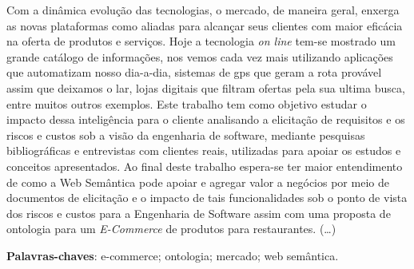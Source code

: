 \begin{resumo}

Com a dinâmica evolução das tecnologias, o mercado, de maneira geral,
 enxerga as novas plataformas como aliadas para alcançar seus clientes com maior
 eficácia na oferta de produtos e serviços. Hoje a tecnologia \textit{on line}
 tem-se mostrado um grande catálogo de informações, nos vemos cada vez
 mais utilizando aplicações que automatizam nosso dia-a-dia, sistemas de gps
 que geram a rota provável assim que deixamos o lar, lojas digitais que filtram
 ofertas pela sua ultima busca, entre muitos outros exemplos. Este trabalho tem
 como objetivo estudar o impacto dessa inteligência para o cliente
 analisando a elicitação de requisitos e os riscos e custos sob a visão da engenharia de 
 software, mediante pesquisas  bibliográficas e entrevistas com clientes  reais, utilizadas para apoiar
 os estudos e conceitos apresentados. Ao final deste trabalho espera-se ter maior
 entendimento de como a Web Semântica pode apoiar e agregar valor a negócios 
 por meio de documentos de elicitação e o impacto de tais funcionalidades sob o ponto de vista
 dos riscos e custos para a Engenharia de Software assim com uma proposta de ontologia para
 um \textit{E-Commerce} de produtos para restaurantes. (\dots)

 \vspace{\onelineskip}
    
 \noindent
 \textbf{Palavras-chaves}: e-commerce; ontologia; mercado; web semântica.
\end{resumo}
